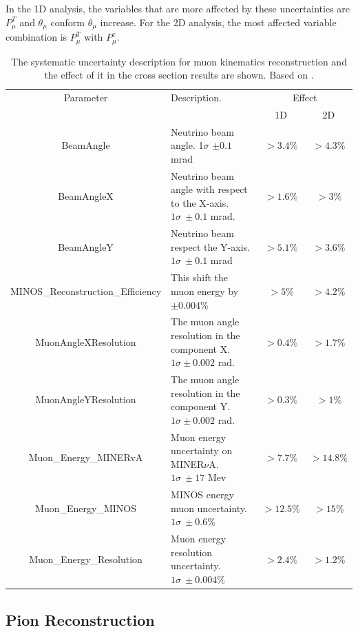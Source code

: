 In the 1D analysis, the variables that are more affected by these uncertainties are $P^T_\mu$ and $\theta_\mu$ conform $\theta_\mu$ increase. For the 2D analysis, the most affected variable combination is $P^T_\mu$ with $P^z_\mu$.  
\begin{table}[!htb]
    \centering
    \begin{tabular}{c|p{2in}|c|c}
        \hline 
        Parameter & Description.  & \multicolumn{2}{c}{Effect} \\
         & & 1D & 2D \\
        \hline  
        BeamAngle & Neutrino beam angle. 1$\sigma$ $\pm0.1$ mrad & $>3.4\%$ & $>4.3\%$\\ \hline
        BeamAngleX & Neutrino beam angle with respect to the X-axis. $1\sigma\ \pm0.1$ mrad. & $>1.6\%$ & $>3\%$ \\ \hline
        BeamAngleY & Neutrino beam respect the Y-axis. $1\sigma\ \pm0.1$ mrad & $>5.1\%$ & $>3.6\%$ \\ \hline
        MINOS\_Reconstruction\_Efficiency & This shift the muon energy by $\pm0.004\%$ & $>5\%$ & $>4.2\%$\\ \hline
        MuonAngleXResolution & The muon angle resolution in the component X. $1\sigma \pm0.002$ rad.  & $>0.4\%$ & $>1.7\%$ \\ \hline
        MuonAngleYResolution & The muon angle resolution in the component Y. $1\sigma \pm0.002$ rad. & $>0.3\%$ & $>1\%$ \\ \hline
        Muon\_Energy\_MINERvA & Muon energy uncertainty on MINER$\nu$A. $1\sigma\ \pm17$ Mev & $>7.7\%$ & $>14.8\%$\\ \hline
        Muon\_Energy\_MINOS & MINOS energy muon uncertainty. $1\sigma\ \pm0.6\%$  & $>12.5\%$ & $>15\%$ \\ \hline
        Muon\_Energy\_Resolution & Muon energy resolution uncertainty. $1\sigma\ \pm0.004\%$ & $>2.4\%$ & $>1.2\%$ \\ \hline
    \end{tabular}
    \caption{The systematic uncertainty description for muon kinematics reconstruction and the effect of it in the cross section results are shown. Based on \cite{AmitBashyal:2021tzd}.}
    \label{tab:ErrorAnalysis:SystematicUnc:Muon}
\end{table}



\pagebreak
\subsection{Pion Reconstruction}
\label{Cap:ErrorAnalysis:SystematicUnc:PionReco}

